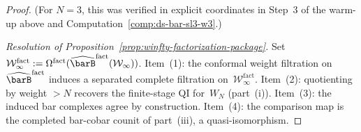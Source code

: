 \begin{proof}
(For $N = 3$, this was verified
in explicit coordinates in Step~3 of the warm-up above and
Computation~\ref{comp:ds-bar-sl3-w3}.)

\emph{Resolution of
Proposition~\textup{\ref{prop:winfty-factorization-package}}.}
Set $\mathcal{W}^{\mathrm{fact}}_\infty :=
\Omega^{\mathrm{fact}}(
\widehat{\barB}^{\mathrm{fact}}(\mathcal{W}_\infty))$.
Item~(1): the conformal weight filtration on
$\widehat{\barB}^{\mathrm{fact}}$ induces a separated complete
filtration on~$\mathcal{W}^{\mathrm{fact}}_\infty$.
Item~(2): quotienting by weight $> N$ recovers the finite-stage
QI for~$W_N$ (part~(i)).
Item~(3): the induced bar complexes agree by construction.
Item~(4): the comparison map is the completed bar-cobar
counit of part~(iii), a quasi-isomorphism.
\end{proof}

